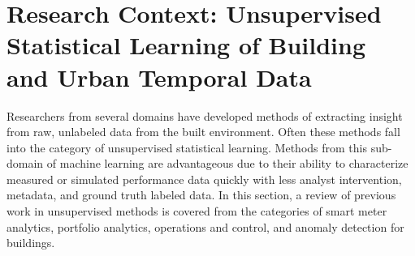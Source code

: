 \section{Research Context: Unsupervised Statistical Learning of Building and Urban Temporal Data}
\label{sec:litreview}

Researchers from several domains have developed methods of extracting insight from raw, unlabeled data from the built environment. Often these methods fall into the category of unsupervised statistical learning. Methods from this sub-domain of machine learning are advantageous due to their ability to characterize measured or simulated performance data quickly with less analyst intervention, metadata, and ground truth labeled data. In this section, a review of previous work in unsupervised methods is covered from the categories of smart meter analytics, portfolio analytics, operations and control, and anomaly detection for buildings. 